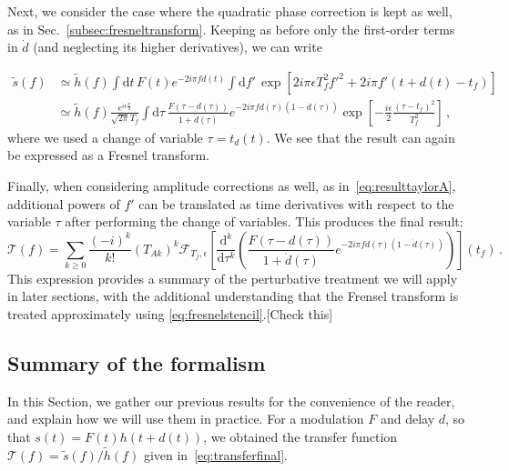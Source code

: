 \documentclass[aps,showpacs,twocolumn,
prd,superscriptaddress,nofootinbib]{revtex4-1}
\newcommand{\be}{\begin{equation}}
\newcommand{\ee}{\end{equation}}
\newcommand\ud{{\mathrm{d}}}
\newcommand\calF{{\mathcal{F}}}
\newcommand\calT{{\mathcal{T}}}
\newcommand{\nn}{\nonumber}
\newcommand{\tf}{t_{f}}
\newcommand{\Tf}{T_{f}}
\newcommand{\jgb}[1]{{\color{DarkGreen} #1}}
\begin{document}
Next, we consider the case where the quadratic phase correction is kept as well, as in Sec.~\ref{subsec:fresneltransform}. Keeping as before only the first-order terms in $\dot{d}$ (and neglecting its higher derivatives), we can write
\begin{widetext}
\begin{align}
	\tilde{s}(f) &\simeq \tilde{h}(f) \int \ud t \, F(t) e^{-2i\pi f d(t)} \int \ud f' \, \exp\left[ 2i\pi \epsilon \Tf^{2} f'^{2} + 2i\pi f' (t+d(t) - \tf) \right] \nn\\
	&\simeq \tilde{h}(f) \frac{e^{i\epsilon\frac{\pi}{4}}}{\sqrt{2\pi}\Tf} \int \ud \tau \, \frac{F(\tau - d(\tau))}{1+\dot{d}(\tau)} e^{-2i\pi f d(\tau)(1-\dot{d}(\tau))}\exp\left[ -\frac{i\epsilon}{2} \frac{(\tau - \tf)^{2}}{\Tf^{2}} \right] \,,
\end{align}
where we used a change of variable $\tau = t_{d}(t)$. We see that the result can again be expressed as a Fresnel transform.

Finally, when considering amplitude corrections as well, as in~\eqref{eq:resulttaylorA}, additional powers of $f'$ can be translated as time derivatives with respect to the variable $\tau$ after performing the change of variables. This produces the final result:
\be\label{eq:transferfinal}
	\calT(f) = \sum\limits_{k \geq 0} \frac{(-i)^{k}}{k!} (T_{Ak})^{k} \calF_{\Tf, \epsilon} \left[ \frac{\ud^{k}}{\ud \tau^{k}} \left( \frac{F(\tau - d(\tau))}{1+\dot{d}(\tau)} e^{-2i\pi f d(\tau)(1-\dot{d}(\tau))} \right) \right] (\tf) \,.
\ee
\jgb{This expression provides a summary of the perturbative treatment we will apply in later sections, with the additional understanding that the Frensel transform is treated approximately using \eqref{eq:fresnelstencil}.[Check this]}
\end{widetext}

\subsection{Summary of the formalism}\label{subsec:executivesummary}

In this Section, we gather our previous results for the convenience of the reader, and explain how we will use them in practice. For a modulation $F$ and delay $d$, so that $s(t) = F(t) h(t+d(t))$, we obtained the transfer function $\calT (f) = \tilde{s}(f)/\tilde{h}(f)$ given in~\eqref{eq:transferfinal}.
\end{document}
